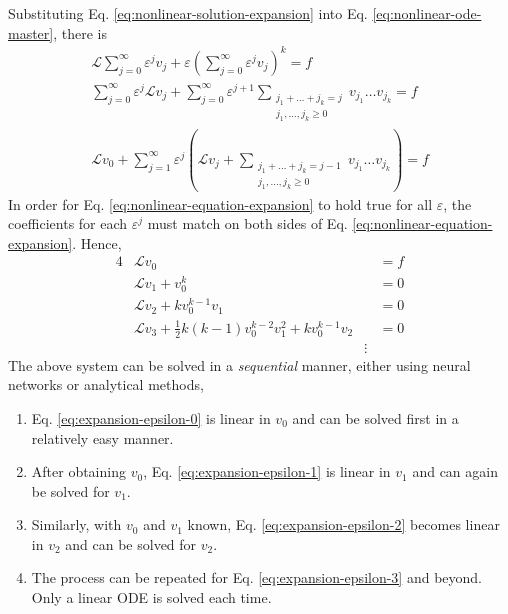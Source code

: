 \documentclass[accepted]{uai2023}
\renewcommand{\L}{\mathcal{L}}
\begin{document}
    Substituting Eq. \ref{eq:nonlinear-solution-expansion} into Eq. \ref{eq:nonlinear-ode-master}, there is
    {
        \small
        \begin{gather}
            \L \sum_{j=0}^{\infty} \varepsilon^j v_j + \varepsilon \left(\sum_{j=0}^{\infty} \varepsilon^j v_j\right)^k = f \\
            \sum_{j=0}^{\infty} \varepsilon^j \L v_j + \sum_{j=0}^{\infty} \varepsilon^{j+1} \sum_{\substack{j_1+\dots+j_k = j\\j_1, \dots, j_k \geq 0}}v_{j_1}\dots v_{j_k} = f \\ 
            \L v_0 + \sum_{j=1}^{\infty} \varepsilon^j \left(\L v_j + \sum_{\substack{j_1+\dots+j_k = j - 1\\j_1, \dots, j_k \geq 0}}v_{j_1}\dots v_{j_k}\right)= f \label{eq:nonlinear-equation-expansion} 
        \end{gather}
    }
    In order for Eq. \ref{eq:nonlinear-equation-expansion} to hold true for all $\varepsilon$, the coefficients for each $\varepsilon^j$ must match on both sides of Eq. \ref{eq:nonlinear-equation-expansion}. Hence,
    {
        \small
        \begin{alignat}{4}
            &\L v_0 &&= f \label{eq:expansion-epsilon-0}\\
            &\L v_1 + v_0^k &&= 0 \label{eq:expansion-epsilon-1}\\
            &\L v_2 + k v_0^{k-1}v_1 &&= 0 \label{eq:expansion-epsilon-2} \\
            &\L v_3 + \frac{1}{2}k(k-1)v_0^{k-2}v_1^2 + k v_0^{k-1}v_2 &&= 0 \label{eq:expansion-epsilon-3}\\
            &&\vdots &\nonumber
        \end{alignat}
    }
    The above system can be solved in a \textit{sequential} manner, either using neural networks or analytical methods,
    \begin{enumerate}
        \item Eq. \ref{eq:expansion-epsilon-0} is linear in $v_0$ and can be solved first in a relatively easy manner. 
        \item After obtaining $v_0$, Eq. \ref{eq:expansion-epsilon-1} is linear in $v_1$ and can again be solved for $v_1$. 
        \item Similarly, with $v_0$ and $v_1$ known, Eq. \ref{eq:expansion-epsilon-2} becomes linear in $v_2$ and can be solved for $v_2$.
        \item The process can be repeated for Eq. \ref{eq:expansion-epsilon-3} and beyond. Only a linear ODE is solved each time.
    \end{enumerate}
\end{document}
